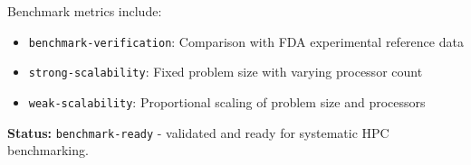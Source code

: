 Benchmark metrics include:
\begin{itemize}
    \item \texttt{benchmark-verification}: Comparison with FDA experimental reference data
    \item \texttt{strong-scalability}: Fixed problem size with varying processor count
    \item \texttt{weak-scalability}: Proportional scaling of problem size and processors
\end{itemize}


\textbf{Status:} \texttt{benchmark-ready} - validated and ready for systematic HPC benchmarking.



